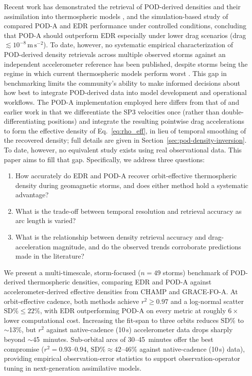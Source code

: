 \documentclass{agujournal2019}
\begin{document}
Recent work has demonstrated the retrieval of POD-derived densities \cite{Fitzpatrick2024ApplyingSatellite, Fitzpatrick2024HarnessingAwareness} and their assimilation into thermospheric models \cite{Sutton2021TowardSatellites, Mutschler2023Physics-BasedData}, and the simulation-based study of  compared POD-A and EDR performance under controlled conditions, concluding that POD-A should outperform EDR especially under lower drag scenarios (drag $\lesssim 10^{-8}\,\mathrm{m\,s^{-2}}$). To date, however, no systematic empirical characterization of POD-derived density retrievals across multiple observed storms against an independent accelerometer reference has been published, despite storms being the regime in which current thermospheric models perform worst \cite{Bruinsma2021ThermosphereStorms}. This gap in benchmarking limits the community’s ability to make informed decisions about how best to integrate POD-derived data into model development and operational workflows. The POD-A implementation employed here differs from that of  and earlier work \cite{Calabia2015ASignal, Bezdek2010CalibrationAccelerations} in that we differentiate the SP3 velocities once (rather than double-differentiating positions) and integrate the resulting pointwise drag accelerations to form the effective density of Eq.~\eqref{eq:rho_eff}, in lieu of temporal smoothing of the recovered density; full details are given in Section~\ref{sec:pod-density-inversion}. To date, however, no equivalent study exists using real observational data. This paper aims to fill that gap. Specifically, we address three questions:
\begin{enumerate}
  \item How accurately do EDR and POD-A recover orbit-effective thermospheric density during geomagnetic storms, and does either method hold a systematic advantage?
  \item What is the trade-off between temporal resolution and retrieval accuracy as arc length is varied?
  \item What is the relationship between density retrieval accuracy and drag-acceleration magnitude, and do the observed trends corroborate predictions made in the literature?
\end{enumerate}

We present a multi-timescale, storm-focused ($n=49$ storms) benchmark of POD-derived thermospheric densities, comparing EDR and POD-A against accelerometer-derived effective densities from CHAMP and GRACE-FO-A. At orbit-effective cadence, both methods achieve $r^{2} \geq 0.97$ and a log-normal scatter $\text{SD\%} \leq 22\%$, with EDR outperforming POD-A on every metric at roughly $6\times$ lower computational cost. Increasing the fit-span to three orbits reduces $\text{SD\%}$ to $\sim$13\%, but $r^{2}$ against native-cadence (10\,s) accelerometer data drops sharply beyond $\sim$45~minutes. Sub-orbital arcs of 30--45~minutes offer the best compromise ($r^{2} = 0.93$--$0.94$, $\text{SD\%} \approx 42$--$46\%$ against native-cadence (10\,s) data), providing empirical observation-error statistics to support observation-operator tuning in next-generation assimilative models.
\end{document}
